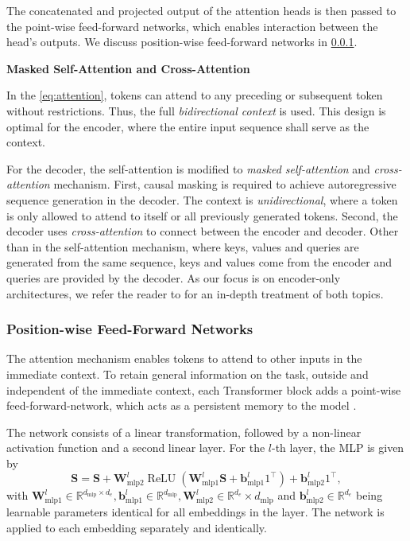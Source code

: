 The concatenated and projected output of the attention heads is then passed to the point-wise feed-forward networks, which enables interaction between the head's outputs. We discuss position-wise feed-forward networks in \cref{sec:position-wise-ffn}.

\textbf{Masked Self-Attention and Cross-Attention}


In the \cref{eq:attention}, tokens can attend to any preceding or subsequent token without restrictions. Thus, the full \emph{bidirectional context} is used. This design is optimal for the encoder, where the entire input sequence shall serve as the context.

For the decoder, the self-attention is modified to \emph{masked self-attention} and \emph{cross-attention} mechanism. First, causal masking is required to achieve autoregressive sequence generation in the decoder. The context is \emph{unidirectional}, where a token is only allowed to attend to itself or all previously generated tokens. Second, the decoder uses \emph{cross-attention} to connect between the encoder and decoder. Other than in the self-attention mechanism, where keys, values and queries are generated from the same sequence, keys and values come from the encoder and queries are provided by the decoder. As our focus is on encoder-only architectures, we refer the reader to \textcite[][16--17]{raffelExploringLimitsTransfer2020} for an in-depth treatment of both topics.

\subsubsection{Position-wise Feed-Forward Networks}\label{sec:position-wise-ffn}

The attention mechanism enables \glspl{token} to attend to other inputs in the immediate context. To retain general information on the task, outside and independent of the immediate context, each Transformer block adds a point-wise \gls{feed-forward-network}, which acts as a persistent memory to the model \autocite[][3]{sukhbaatarAugmentingSelfattentionPersistent2019}.

The network consists of a linear transformation, followed by a non-linear activation function and a second linear layer. For the $l$-th layer, the \gls{MLP} is given by
\begin{equation}
    \mathbf{S} = \mathbf{S}+\mathbf{W}_{\mathrm{mlp} 2}^l \operatorname{ReLU}\left(\mathbf{W}_{\mathrm{mlp} 1}^l \mathbf{S}+\mathbf{b}_{\mathrm{mlp} 1}^l 1^{\top}\right)+\mathbf{b}_{\mathrm{mlp} 2}^l 1^{\top},
\end{equation}
with $\mathbf{W}_{\mathrm{mlp} 1}^l \in \mathbb{R}^{d_{\mathrm{mlp}} \times d_{e}}, \mathbf{b}_{\mathrm{mlp} 1}^l \in \mathbb{R}^{d_{\mathrm{mlp}}}, \mathbf{W}_{\mathrm{mlp} 2}^l \in \mathbb{R}^{d_{e}} \times d_{\mathrm{mlp}}$ and $\mathbf{b}_{\mathrm{mlp} 2}^l \in \mathbb{R}^{d_{e}}$ being learnable parameters identical for all \glspl{embedding} in the layer. The network is applied to each embedding separately and identically.

